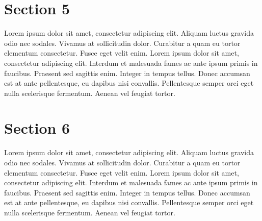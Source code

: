 \thispagestyle{fancy}

\section{Section 5}
Lorem ipsum dolor sit amet, consectetur adipiscing elit. Aliquam luctus gravida odio nec sodales. Vivamus at sollicitudin dolor. Curabitur a quam eu tortor elementum consectetur. Fusce eget velit enim. Lorem ipsum dolor sit amet, consectetur adipiscing elit. Interdum et malesuada fames ac ante ipsum primis in faucibus. Praesent sed sagittis enim. Integer in tempus tellus. Donec accumsan est at ante pellentesque, eu dapibus nisi convallis. Pellentesque semper orci eget nulla scelerisque fermentum. Aenean vel feugiat tortor.

\thispagestyle{fancy}

\section{Section 6}
Lorem ipsum dolor sit amet, consectetur adipiscing elit. Aliquam luctus gravida odio nec sodales. Vivamus at sollicitudin dolor. Curabitur a quam eu tortor elementum consectetur. Fusce eget velit enim. Lorem ipsum dolor sit amet, consectetur adipiscing elit. Interdum et malesuada fames ac ante ipsum primis in faucibus. Praesent sed sagittis enim. Integer in tempus tellus. Donec accumsan est at ante pellentesque, eu dapibus nisi convallis. Pellentesque semper orci eget nulla scelerisque fermentum. Aenean vel feugiat tortor.

\thispagestyle{fancy}

